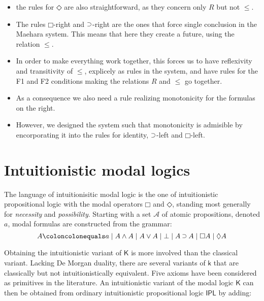 \documentclass[a4paper]{article}
\theoremstyle{plain}
\theoremstyle{definition}
\newcommand*{\K}{\mathsf{K}}
\newcommand*{\AND}{\mathbin{\wedge}}
\newcommand*{\OR}{\mathbin{\vee}}
\newcommand*{\BOT}{\mathord{\bot}}
\newcommand*{\IMP}{\mathbin{\scalebox{.9}{\raise.2ex\hbox{$\supset$}}}}
\newcommand*{\BOX}{\mathord{\Box}}
\newcommand*{\DIA}{\mathord{\Diamond}}
\newcommand*{\rn}[1]  {\ensuremath{\mathsf{#1}}}
\begin{document}
{\begin{itemize}
\begin{itemize}
      identity, but there is a subtlety; see below...
    \item the rules for $\DIA$ are also straightforward, as they
      concern only $R$ but not $\le$.
    \item The rules $\BOX$-right and $\IMP$-right are the ones that
      force single conclusion in the Maehara system. This means that
      here they create a future, using the relation $\le$.
    \item In order to make everything work together, this forces us to
      have reflexivity and transitivity of $\le$, explicely as rules
      in the system, and have rules for the F1 and F2 conditions
      making the relations $R$ and $\le$ go together.
    \item As a consequence we also need a rule realizing monotonicity
      for the formulas on the right.
    \item However, we designed the system such that monotonicity is
      admisible by encorporating it into the rules for identity,
      $\IMP$-left and $\BOX$-left.
    \end{itemize}
  \end{itemize}
}
%

%
%
\section{Intuitionistic modal logics}\label{sec:intmod}
The language of {intuitionisitic modal logic} is the one of intuitionistic propositional logic with the modal operators $\BOX$ and $\DIA$, standing most generally for \emph{necessity} and \emph{possibility}.
%
Starting with a set $\mathcal{A}$ of atomic propositions, denoted $a$, modal formulas are constructed from the grammar:
%
$$
A \coloncolonequals
a \mid A \AND A \mid A \OR A \mid \BOT \mid A \IMP A \mid \BOX A \mid \DIA A
$$
%

Obtaining the intuitionistic variant of $\mathsf{K}$ is more involved than the classical variant. 
Lacking De Morgan duality, there are several variants of $\mathsf{k}$ that are classically but not intuitionistically equivalent. Five axioms have been considered as primitives in the literature. An intuitionistic variant of the modal logic $\K$ can then be obtained from ordinary intuitionistic propositional logic $\rn{IPL}$ by adding:
%
\end{document}
